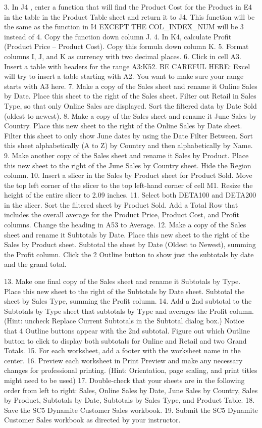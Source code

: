 3. In J4 , enter a  function that will find the Product Cost for the Product in E4 in the
table in the Product Table sheet and return it to J4. This  function will be the same as
the  function in I4 EXCEPT THE COL\_INDEX\_NUM will be 3 instead of 4. Copy
the function down column J.
4. In K4, calculate Profit (Product Price – Product Cost). Copy this formula down column K.
5. Format columns I, J, and K as currency with two decimal places.
6. Click in cell A3. Insert a table with headers for the range A3:K52. BE CAREFUL HERE: Excel
will try to insert a table starting with A2. You want to make sure your range starts with A3 here.
7. Make a copy of the Sales sheet and rename it Online Sales by Date. Place this sheet to the right
of the Sales sheet. Filter out Retail in Sales Type, so that only Online Sales are displayed. Sort the
filtered data by Date Sold (oldest to newest).
8. Make a copy of the Sales sheet and rename it June Sales by Country. Place this new sheet to the
right of the Online Sales by Date sheet. Filter this sheet to only show June dates by using the
Date Filter Between. Sort this sheet alphabetically (A to Z) by Country and then alphabetically
by Name.
9. Make another copy of the Sales sheet and rename it Sales by Product. Place this new sheet to
the right of the June Sales by Country sheet. Hide the Region column.
10. Insert a slicer in the Sales by Product sheet for Product Sold. Move the top left corner of the
slicer to the top left-hand corner of cell M1. Resize the height of the entire slicer to 2.09 inches.
11. Select both DETA100 and DETA200 in the slicer. Sort the filtered sheet by Product Sold. Add a
Total Row that includes the overall average for the Product Price, Product Cost, and Profit
columns. Change the heading in A53 to Average.
12. Make a copy of the Sales sheet and rename it Subtotals by Date. Place this new sheet to the
right of the Sales by Product sheet. Subtotal the sheet by Date (Oldest to Newest), summing the
Profit column. Click the 2 Outline button to show just the subtotals by date and the grand total.


13. Make one final copy of the Sales sheet and rename it Subtotals by Type. Place this new sheet to
the right of the Subtotals by Date sheet. Subtotal the sheet by Sales Type, summing the Profit
column.
14. Add a 2nd subtotal to the Subtotals by Type sheet that subtotals by Type and averages the Profit
column. (Hint: uncheck Replace Current Subtotals in the Subtotal dialog box.) Notice that 4
Outline buttons appear with the 2nd subtotal. Figure out which Outline button to click to
display both subtotals for Online and Retail and two Grand Totals.
15. For each worksheet, add a footer with the worksheet name in the center.
16. Preview each worksheet in Print Preview and make any necessary changes for professional
printing. (Hint: Orientation, page scaling, and print titles might need to be used)
17. Double-check that your sheets are in the following order from left to right: Sales, Online Sales
by Date, June Sales by Country, Sales by Product, Subtotals by Date, Subtotals by Sales Type,
and Product Table.
18. Save the SC5 Dynamite Customer Sales workbook.
19. Submit the SC5 Dynamite Customer Sales workbook as directed by your instructor.

